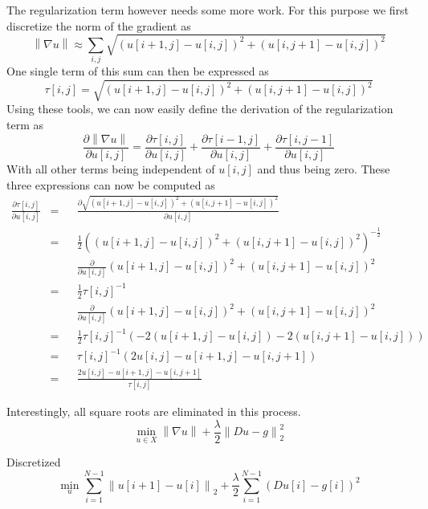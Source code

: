 \documentclass{paper}
\newcommand{\norm}[1]{\left\lVert#1\right\rVert}
\begin{document}
The regularization term however needs some more work. 
For this purpose we first discretize the norm of the gradient as
\begin{equation}
\norm{\nabla u} \approx \sum_{i,j} 
	\sqrt{(u[i+1,j] - u[i,j])^2 + (u[i, j+1] - u[i, j])^2}
\end{equation}
One single term of this sum can then be expressed as
\begin{equation}
\tau[i,j] = \sqrt{(u[i+1,j] - u[i,j])^2 + (u[i, j+1] - u[i, j])^2}
\end{equation}
Using these tools, we can now easily define the derivation of the regularization term as
\begin{equation}
\frac{\partial \norm{\nabla u}}{\partial u[i,j]} = 
	\frac{\partial \tau[i,j]}{\partial u[i,j]} +
	\frac{\partial \tau[i - 1,j]}{\partial u[i,j]} +
	\frac{\partial \tau[i,j - 1]}{\partial u[i,j]}
\end{equation}
With all other terms being independent of $u[i,j]$ and thus being zero.
These three expressions can now be computed as
\begin{align}
\frac{\partial \tau[i,j]}{\partial u[i,j]} 
&= &&\frac{\partial \sqrt{(u[i+1,j] - u[i,j])^2 + (u[i, j+1] - u[i, j])^2}}{\partial u[i,j]} \\
&= &&\frac{1}{2} ((u[i+1,j] - u[i,j])^2 + (u[i, j+1] - u[i, j])^2)^{-\frac{1}{2}} \\
& &&\frac{\partial}{\partial u[i,j]} 
(u[i+1,j] - u[i,j])^2 + (u[i, j+1] - u[i, j])^2 \\
&= &&\frac{1}{2}\tau[i,j]^{-1} \\
& &&\frac{\partial}{\partial u[i,j]} 
(u[i+1,j] - u[i,j])^2 + (u[i, j+1] - u[i, j])^2 \\
&= &&\frac{1}{2}\tau[i,j]^{-1}
(-2(u[i + 1, j] - u[i,j]) - 2(u[i, j+1] - u[i,j])) \\
&= &&\tau[i,j]^{-1} (2 u[i,j] -u[i + 1, j] - u[i, j+1]) \\
&= &&\frac{2u[i,j] - u[i + 1, j] - u[i, j+1]}{\tau[i,j]}
\end{align}

Interestingly, all square roots are eliminated in this process.
\begin{equation}
\min_{u \in X} \norm{\nabla u} + \frac{\lambda}{2} \norm{Du - g}^2_2
\end{equation}

Discretized 
\begin{equation}
\min_{u} \sum_{i=1}^{N-1} \norm{u[i+1] - u[i]}_2 + 
\frac{\lambda}{2} \sum_{i=1}^{N-1} (Du[i] - g[i])^2
\end{equation}
\end{document}
